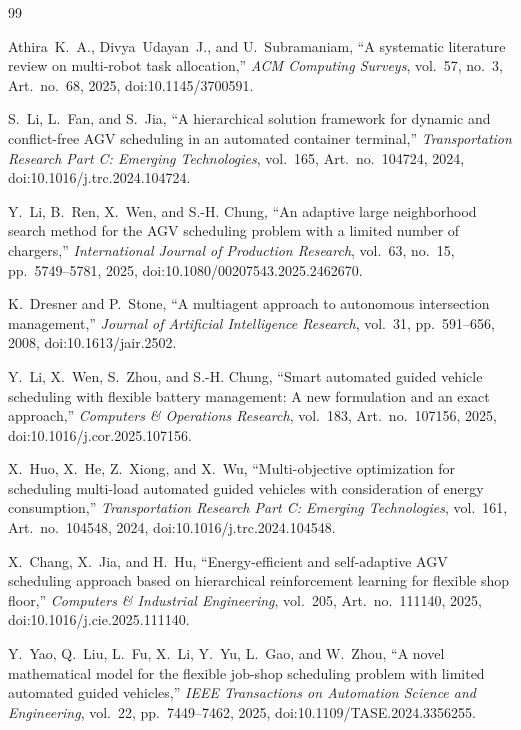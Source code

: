 \begin{thebibliography}{99}
\small\raggedright

Athira~K.~A., Divya~Udayan~J., and U.~Subramaniam, ``A systematic literature review on multi-robot
task allocation,'' \emph{ACM Computing Surveys}, vol.~57, no.~3, Art.~no.~68, 2025,
doi:10.1145/3700591.

S.~Li, L.~Fan, and S.~Jia, ``A hierarchical solution framework for dynamic and conflict-free AGV
scheduling in an automated container terminal,'' \emph{Transportation Research Part C: Emerging
Technologies}, vol.~165, Art.~no.~104724, 2024, doi:10.1016/j.trc.2024.104724.

Y.~Li, B.~Ren, X.~Wen, and S.-H. Chung, ``An adaptive large neighborhood search method for the AGV
scheduling problem with a limited number of chargers,'' \emph{International Journal of Production
Research}, vol.~63, no.~15, pp.~5749--5781, 2025, doi:10.1080/00207543.2025.2462670.

K.~Dresner and P.~Stone, ``A multiagent approach to autonomous intersection management,''
\emph{Journal of Artificial Intelligence Research}, vol.~31, pp.~591--656, 2008,
doi:10.1613/jair.2502.

Y.~Li, X.~Wen, S.~Zhou, and S.-H. Chung, ``Smart automated guided vehicle scheduling with flexible
battery management: A new formulation and an exact approach,'' \emph{Computers \& Operations
Research}, vol.~183, Art.~no.~107156, 2025, doi:10.1016/j.cor.2025.107156.

X.~Huo, X.~He, Z.~Xiong, and X.~Wu, ``Multi-objective optimization for scheduling multi-load
automated guided vehicles with consideration of energy consumption,'' \emph{Transportation Research
Part C: Emerging Technologies}, vol.~161, Art.~no.~104548, 2024, doi:10.1016/j.trc.2024.104548.

X.~Chang, X.~Jia, and H.~Hu, ``Energy-efficient and self-adaptive AGV scheduling approach based on
hierarchical reinforcement learning for flexible shop floor,'' \emph{Computers \& Industrial
Engineering}, vol.~205, Art.~no.~111140, 2025, doi:10.1016/j.cie.2025.111140.

Y.~Yao, Q.~Liu, L.~Fu, X.~Li, Y.~Yu, L.~Gao, and W.~Zhou, ``A novel mathematical model for the
flexible job-shop scheduling problem with limited automated guided vehicles,'' \emph{IEEE Transactions
on Automation Science and Engineering}, vol.~22, pp.~7449--7462, 2025,
doi:10.1109/TASE.2024.3356255.


\end{thebibliography}
